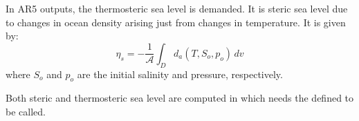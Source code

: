 \documentclass[NEMO_book]{subfiles}
\begin{document}
In AR5 outputs, the thermosteric sea level is demanded. It is steric sea level due to 
changes in ocean density arising just from changes in temperature. It is given by:
\begin{equation}  \label{Eq_thermosteric_Bq}
   \eta_s = - \frac{1}{\mathcal{A}} \int_D d_a(T,S_o,p_o) \,dv
\end{equation}
where $S_o$ and $p_o$ are the initial salinity and pressure, respectively.

Both steric and thermosteric sea level are computed in  which needs
the  defined to be called.

\end{document}
